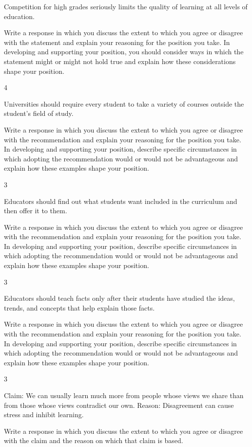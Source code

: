 \documentclass[]{article}
\begin{document}
Competition for high grades seriously limits the quality of learning at
all levels of education.

Write a response in which you discuss the extent to which you agree or
disagree with the statement and explain your reasoning for the position
you take. In developing and supporting your position, you should
consider ways in which the statement might or might not hold true and
explain how these considerations shape your position.

4

Universities should require every student to take a variety of courses
outside the student's field of study.

Write a response in which you discuss the extent to which you agree or
disagree with the recommendation and explain your reasoning for the
position you take. In developing and supporting your position, describe
specific circumstances in which adopting the recommendation would or
would not be advantageous and explain how these examples shape your
position.

3

Educators should find out what students want included in the curriculum
and then offer it to them.

Write a response in which you discuss the extent to which you agree or
disagree with the recommendation and explain your reasoning for the
position you take. In developing and supporting your position, describe
specific circumstances in which adopting the recommendation would or
would not be advantageous and explain how these examples shape your
position.

3

Educators should teach facts only after their students have studied the
ideas, trends, and concepts that help explain those facts.

Write a response in which you discuss the extent to which you agree or
disagree with the recommendation and explain your reasoning for the
position you take. In developing and supporting your position, describe
specific circumstances in which adopting the recommendation would or
would not be advantageous and explain how these examples shape your
position.

3

Claim: We can usually learn much more from people whose views we share
than from those whose views contradict our own. Reason: Disagreement can
cause stress and inhibit learning.

Write a response in which you discuss the extent to which you agree or
disagree with the claim and the reason on which that claim is based.
\end{document}
